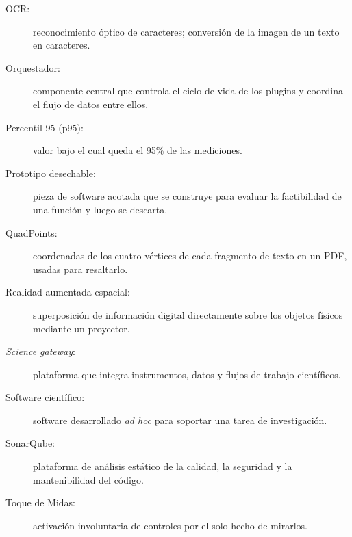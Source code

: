 \begin{description}
  \item[OCR:] reconocimiento óptico de caracteres; conversión de la imagen de un texto en caracteres.
  \item[Orquestador:] componente central que controla el ciclo de vida de los plugins y coordina el flujo de datos entre ellos.
  \item[Percentil 95 (p95):] valor bajo el cual queda el 95\% de las mediciones.
  \item[Prototipo desechable:] pieza de software acotada que se construye para evaluar la factibilidad de una función y luego se descarta.
  \item[QuadPoints:] coordenadas de los cuatro vértices de cada fragmento de texto en un PDF, usadas para resaltarlo.
  \item[Realidad aumentada espacial:] superposición de información digital directamente sobre los objetos físicos mediante un proyector.
  \item[\textit{Science gateway}:] plataforma que integra instrumentos, datos y flujos de trabajo científicos.
  \item[Software científico:] software desarrollado \textit{ad hoc} para soportar una tarea de investigación.
  \item[SonarQube:] plataforma de análisis estático de la calidad, la seguridad y la mantenibilidad del código.
  \item[Toque de Midas:] activación involuntaria de controles por el solo hecho de mirarlos.
\end{description}
